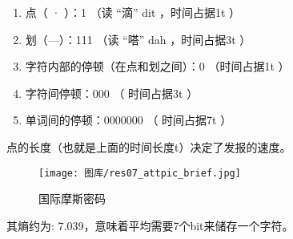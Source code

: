 \documentclass{article}
\begin{document}
\begin{enumerate}
\item 点（ · ）：1 （读 “滴” dit ，时间占据1t ）
\item 划（—）：111 （读 “嗒” dah ，时间占据3t ）
\item 字符内部的停顿（在点和划之间）：0 （时间占据1t ）
\item 字符间停顿：000 （ 时间占据3t ）
\item 单词间的停顿：0000000 （ 时间占据7t ）
\end{enumerate}

点的长度（也就是上面的时间长度t）决定了发报的速度。

\begin{figure}[H] %
\centering %
\texttt{[image: 图库/res07\_attpic\_brief.jpg]} %
\caption{国际摩斯密码} %
\label{Fig.main2} %
\end{figure}

其熵约为: 7.039，意味着平均需要7个bit来储存一个字符。
\end{document}
